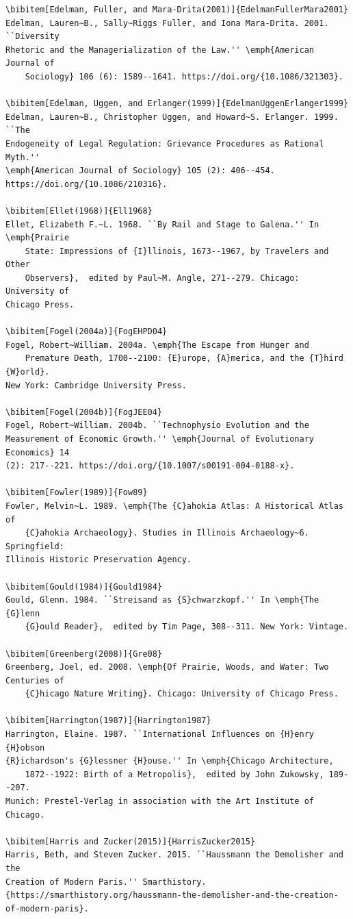 \documentclass[]{interact}
\theoremstyle{plain}%
\theoremstyle{definition}
\theoremstyle{remark}
\begin{document}
\begin{verbatim}
\bibitem[Edelman, Fuller, and Mara-Drita(2001)]{EdelmanFullerMara2001}
Edelman, Lauren~B., Sally~Riggs Fuller, and Iona Mara-Drita. 2001. ``Diversity
Rhetoric and the Managerialization of the Law.'' \emph{American Journal of
	Sociology} 106 (6): 1589--1641. https://doi.org/{10.1086/321303}.

\bibitem[Edelman, Uggen, and Erlanger(1999)]{EdelmanUggenErlanger1999}
Edelman, Lauren~B., Christopher Uggen, and Howard~S. Erlanger. 1999. ``The
Endogeneity of Legal Regulation: Grievance Procedures as Rational Myth.''
\emph{American Journal of Sociology} 105 (2): 406--454.
https://doi.org/{10.1086/210316}.

\bibitem[Ellet(1968)]{Ell1968}
Ellet, Elizabeth F.~L. 1968. ``By Rail and Stage to Galena.'' In \emph{Prairie
	State: Impressions of {I}llinois, 1673--1967, by Travelers and Other
	Observers},  edited by Paul~M. Angle, 271--279. Chicago: University of
Chicago Press.

\bibitem[Fogel(2004a)]{FogEHPD04}
Fogel, Robert~William. 2004a. \emph{The Escape from Hunger and
	Premature Death, 1700--2100: {E}urope, {A}merica, and the {T}hird {W}orld}.
New York: Cambridge University Press.

\bibitem[Fogel(2004b)]{FogJEE04}
Fogel, Robert~William. 2004b. ``Technophysio Evolution and the
Measurement of Economic Growth.'' \emph{Journal of Evolutionary Economics} 14
(2): 217--221. https://doi.org/{10.1007/s00191-004-0188-x}.

\bibitem[Fowler(1989)]{Fow89}
Fowler, Melvin~L. 1989. \emph{The {C}ahokia Atlas: A Historical Atlas of
	{C}ahokia Archaeology}. Studies in Illinois Archaeology~6. Springfield:
Illinois Historic Preservation Agency.

\bibitem[Gould(1984)]{Gould1984}
Gould, Glenn. 1984. ``Streisand as {S}chwarzkopf.'' In \emph{The {G}lenn
	{G}ould Reader},  edited by Tim Page, 308--311. New York: Vintage.

\bibitem[Greenberg(2008)]{Gre08}
Greenberg, Joel, ed. 2008. \emph{Of Prairie, Woods, and Water: Two Centuries of
	{C}hicago Nature Writing}. Chicago: University of Chicago Press.

\bibitem[Harrington(1987)]{Harrington1987}
Harrington, Elaine. 1987. ``International Influences on {H}enry {H}obson
{R}ichardson's {G}lessner {H}ouse.'' In \emph{Chicago Architecture,
	1872--1922: Birth of a Metropolis},  edited by John Zukowsky, 189--207.
Munich: Prestel-Verlag in association with the Art Institute of Chicago.

\bibitem[Harris and Zucker(2015)]{HarrisZucker2015}
Harris, Beth, and Steven Zucker. 2015. ``Haussmann the Demolisher and the
Creation of Modern Paris.'' Smarthistory.
{https://smarthistory.org/haussmann-the-demolisher-and-the-creation-of-modern-paris}.


\end{verbatim}
\end{document}
